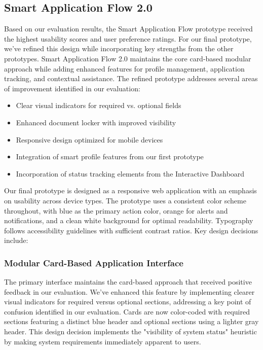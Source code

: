 \documentclass[
	letterpaper, %
]{jdf}
\begin{document}
\begin{sloppypar}
\subsection{Smart Application Flow 2.0}
Based on our evaluation results, the Smart Application Flow prototype received the highest usability scores and user preference ratings. For our final prototype, we've refined this design while incorporating key strengths from the other prototypes. Smart Application Flow 2.0 maintains the core card-based modular approach while adding enhanced features for profile management, application tracking, and contextual assistance.
The refined prototype addresses several areas of improvement identified in our evaluation:
\begin{itemize}
    \item Clear visual indicators for required vs. optional fields
    \item Enhanced document locker with improved visibility
    \item Responsive design optimized for mobile devices
    \item Integration of smart profile features from our first prototype
    \item Incorporation of status tracking elements from the Interactive Dashboard
\end{itemize}

Our final prototype is designed as a responsive web application with an emphasis on usability across device types. The prototype uses a consistent color scheme throughout, with blue as the primary action color, orange for alerts and notifications, and a clean white background for optimal readability. Typography follows accessibility guidelines with sufficient contrast ratios.
Key design decisions include:
\subsubsection{Modular Card-Based Application Interface}
The primary interface maintains the card-based approach that received positive feedback in our evaluation. We've enhanced this feature by implementing clearer visual indicators for required versus optional sections, addressing a key point of confusion identified in our evaluation. Cards are now color-coded with required sections featuring a distinct blue header and optional sections using a lighter gray header. This design decision implements the "visibility of system status" heuristic by making system requirements immediately apparent to users.


\end{sloppypar}
\end{document}
